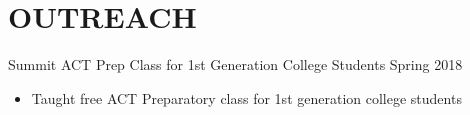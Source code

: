  \section{OUTREACH}
Summit ACT Prep Class for 1st Generation College Students \hfill Spring 2018\\
\begin{itemize}
\item Taught free ACT Preparatory class for 1st generation college students 
\end{itemize}
